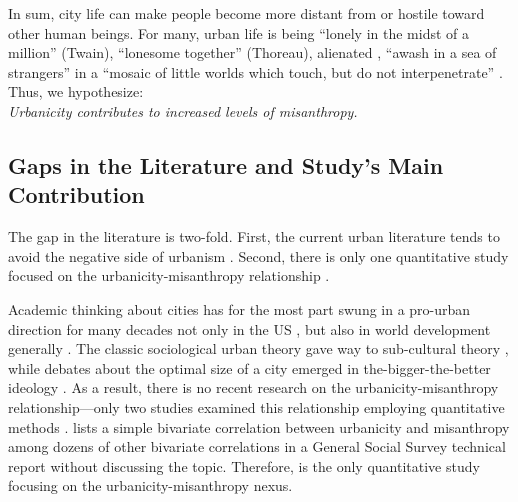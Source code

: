 \documentclass[11pt, letterpaper]{article}
\begin{document}
\begin{spacing}{1.4}
In sum, city life can make people become more distant from or hostile toward other human beings. %
For many, urban life is being ``lonely in the midst of a million'' (Twain), ``lonesome together''
(Thoreau), alienated \citep{wirth38,nettler1957measure}, ``awash in a sea of strangers''
\citep[Merry cited in][p. 99]{wilson85} in a ``mosaic of little worlds which touch, but do not interpenetrate'' \citep[][p. 40]{park84}. Thus, we hypothesize: \\
 
{\indent\hspace{1in}\textit{Urbanicity contributes to increased levels of misanthropy.\\}}
     

\subsection*{Gaps in the Literature and Study's Main Contribution} 

The gap in the literature is two-fold. First, the current urban literature tends
to avoid the negative side of  urbanism
\citep{thrift05,amin06,aokCityBook15,peck16}. Second, there is only one
quantitative study  focused on the urbanicity-misanthropy relationship \citep{wilson85}. 

Academic thinking about cities has for the most part swung in a pro-urban direction for many decades not only in the US \citep{hansonCityJournalautumn15}, but also in world development generally \citep{lipton77}. The classic sociological urban theory \citep{wirth38,milgram70,park15,park84,simmel03,tonnies57} gave way to
  sub-cultural theory \citep{fischer75,fischer95,wilson85, palisi83}, while debates about the optimal size of a city \citep{richardson72,singell74,alonso60,alonso71,elgin75,capello00} emerged in the-bigger-the-better ideology \citep{glaeser11}. As a result, there is no recent research on the urbanicity-misanthropy relationship---only two studies examined this relationship employing quantitative methods \citep{wilson85,smith97}. \citet{smith97} lists a simple bivariate correlation between urbanicity and misanthropy among dozens of other bivariate correlations in a General Social Survey technical report without discussing the topic. 
Therefore, \citet{wilson85} is the only  quantitative study focusing on the urbanicity-misanthropy nexus.%



\end{spacing}
\end{document}
